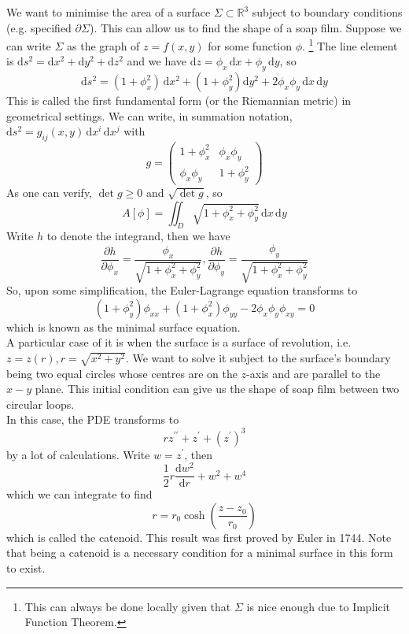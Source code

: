 \begin{example}
    We want to minimise the area of a surface $\Sigma\subset\mathbb R^3$ subject to boundary conditions (e.g. specified $\partial\Sigma$).
    This can allow us to find the shape of a soap film.
    Suppose we can write $\Sigma$ as the graph of $z=f(x,y)$ for some function $\phi$.
    \footnote{This can always be done locally given that $\Sigma$ is nice enough due to Implicit Function Theorem.}
    The line element is $\mathrm ds^2=\mathrm dx^2+\mathrm dy^2+\mathrm dz^2$ and we have $\mathrm dz=\phi_x\,\mathrm dx+\phi_y\,\mathrm dy$, so
    $$\mathrm ds^2=(1+\phi_x^2)\,\mathrm dx^2+(1+\phi_y^2)\mathrm dy^2+2\phi_x\phi_y\,\mathrm dx\,\mathrm dy$$
    This is called the first fundamental form (or the Riemannian metric) in geometrical settings.
    We can write, in summation notation, $\mathrm ds^2=g_{ij}(x,y)\,\mathrm dx^i\,\mathrm dx^j$ with
    $$g=\begin{pmatrix}
            1+\phi_x^2&\phi_x\phi_y\\
            \phi_x\phi_y&1+\phi_y^2
    \end{pmatrix}$$
    As one can verify, $\det g\ge 0$ and $\sqrt{\det g}$, so
    $$A[\phi]=\iint_D\sqrt{1+\phi_x^2+\phi_y^2}\,\mathrm dx\,\mathrm dy$$
    Write $h$ to denote the integrand, then we have
    $$\frac{\partial h}{\partial\phi_x}=\frac{\phi_x}{\sqrt{1+\phi_x^2+\phi_y^2}},\frac{\partial h}{\partial\phi_y}=\frac{\phi_y}{\sqrt{1+\phi_x^2+\phi_y^2}}$$
    So, upon some simplification, the Euler-Lagrange equation transforms to
    $$(1+\phi_y^2)\phi_{xx}+(1+\phi_x^2)\phi_{yy}-2\phi_x\phi_y\phi_{xy}=0$$
    which is known as the minimal surface equation.\\
    A particular case of it is when the surface is a surface of revolution, i.e. $z=z(r),r=\sqrt{x^2+y^2}$.
    We want to solve it subject to the surface's boundary being two equal circles whose centres are on the $z$-axis and are parallel to the $x-y$ plane.
    This initial condition can give us the shape of soap film between two circular loops.\\
    In this case, the PDE transforms to
    $$rz^{\prime\prime}+z^\prime+(z^\prime)^3$$
    by a lot of calculations.
    Write $w=z^\prime$, then
    $$\frac{1}{2}r\frac{\mathrm dw^2}{\mathrm dr}+w^2+w^4$$
    which we can integrate to find
    $$r=r_0\cosh\left( \frac{z-z_0}{r_0} \right)$$
    which is called the catenoid.
    This result was first proved by Euler in 1744.
    Note that being a catenoid is a necessary condition for a minimal surface in this form to exist.\\

\end{example}

